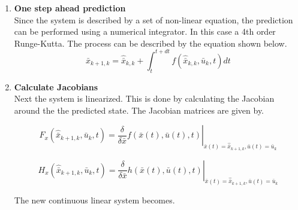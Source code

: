 \begin{enumerate}
    \item \textbf{One step ahead prediction}\\
    Since the system is described by a set of non-linear equation, the prediction can be performed using a numerical integrator. In this case a 4th order Runge-Kutta. The process can be described by the equation shown below. 
    \begin{equation}
        {{\hat{\bar x}}_{k + 1,k}} = {{\hat{\bar x}}_{k,k}} + \int_t^{t + dt} f \left( {{{\hat{\bar x}}_{k,k}},{{\bar u}_k},t} \right)dt
    \end{equation}
    \item \textbf{Calculate Jacobians}\\
    Next the system is linearized. This is done by calculating the Jacobian around the the predicted state. The Jacobian matrices are given by.

    \begin{equation}
        {\left. {{F_x}\left( {{{\hat{\bar x}}_{k + 1,k}},{{\bar u}_k},t} \right) = \frac{\delta }{{\delta \bar x}}f\left( {\bar x\left( t \right),\bar u\left( t \right),t} \right)} \right|_{\bar x\left( t \right) = {{\hat {\bar x}}_{k + 1,k}},\bar u\left( t \right) = {{\bar u}_k}}}
    \end{equation}

    \begin{equation}
        {\left. {{H_x}\left( {{{\hat{\bar x}}_{k + 1,k}},{{\bar u}_k},t} \right) = \frac{\delta }{{\delta \bar x}}h\left( {\bar x\left( t \right),\bar u\left( t \right),t} \right)} \right|_{\bar x\left( t \right) = {{\hat{\bar x}}_{k + 1,k}},\bar u\left( t \right) = {{\bar u}_k}}}
    \end{equation}

    The new continuous linear system becomes.



\end{enumerate}
